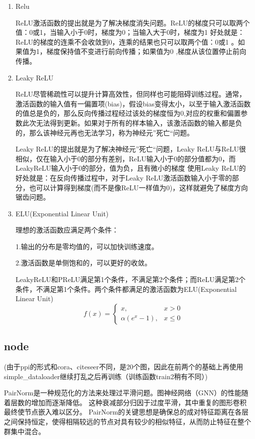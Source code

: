 \documentclass[a4paper,AutoFakeBold,AutoFakeSlant]{ctexart}
\begin{document}
\begin{enumerate}
  \item Relu
  
  ReLU激活函数的提出就是为了解决梯度消失问题。ReLU的梯度只可以取两个值：0或1，当输入小于0时，梯度为0；当输入大于0时，梯度为1
  好处就是：ReLU的梯度的连乘不会收敛到0，连乘的结果也只可以取两个值：0或1 。如果值为1，梯度保持值不变进行前向传播；如果值为0 ,梯度从该位置停止前向传播。
  \item Leaky ReLU
  
  ReLU尽管稀疏性可以提升计算高效性，但同样也可能阻碍训练过程。通常，激活函数的输入值有一偏置项(bias)，假设bias变得太小，以至于输入激活函数的值总是负的，那么反向传播过程经过该处的梯度恒为0,对应的权重和偏置参数此次无法得到更新。如果对于所有的样本输入，该激活函数的输入都是负的，那么该神经元再也无法学习，称为神经元”死亡“问题。

  Leaky ReLU的提出就是为了解决神经元”死亡“问题，Leaky ReLU与ReLU很相似，仅在输入小于0的部分有差别，ReLU输入小于0的部分值都为0，而LeakyReLU输入小于0的部分，值为负，且有微小的梯度
  使用Leaky ReLU的好处就是：在反向传播过程中，对于Leaky ReLU激活函数输入小于零的部分，也可以计算得到梯度(而不是像ReLU一样值为0)，这样就避免了梯度方向锯齿问题。
  \item ELU(Exponential Linear Unit)
  
  理想的激活函数应满足两个条件：

1.输出的分布是零均值的，可以加快训练速度。

2.激活函数是单侧饱和的，可以更好的收敛。

LeakyReLU和PReLU满足第1个条件，不满足第2个条件；而ReLU满足第2个条件，不满足第1个条件。两个条件都满足的激活函数为ELU(Exponential Linear Unit)
\begin{equation*}
  f(x)=\left\{\begin{array}{ll}
    x, & x>0 \\
    \alpha\left(e^{x}-1\right), & x \leq 0
    \end{array}\right.
\end{equation*}
\end{enumerate}

\subsection{node}
(由于ppi的形式和cora、citeseer不同，是20个图，因此在前两个的基础上再使用simple\_dataloader继续打乱之后再训练（训练函数train2稍有不同）)

PairNorm是一种规范化的方法来处理过平滑问题。图神经网络（GNN）的性能随着层数的增加而逐渐降低。 这种衰减部分归因于过度平滑，其中重复的图形卷积最终使节点嵌入难以区分。
PairNorm的关键思想是确保总的成对特征距离在各层之间保持恒定，使得相隔较远的节点对具有较少的相似特征，从而防止特征在整个群集中混合。
\end{document}
